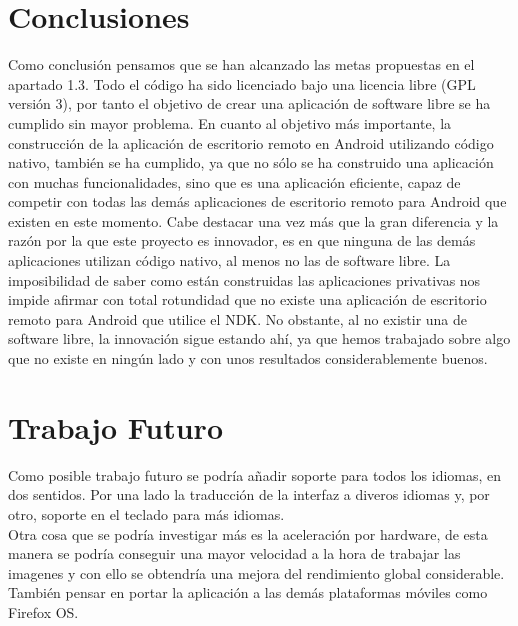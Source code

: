 \section{Conclusiones}
Como conclusión pensamos que se han alcanzado las metas propuestas en el apartado 1.3. Todo el código ha sido licenciado bajo una licencia libre (GPL versión 3), por tanto el objetivo de crear una aplicación de software libre se ha cumplido sin mayor problema. En cuanto al objetivo más importante, la construcción de la aplicación de escritorio remoto en Android utilizando código nativo, también se ha cumplido, ya que no sólo se ha construido una aplicación con muchas funcionalidades, sino que es una aplicación eficiente, capaz de competir con todas las demás aplicaciones de escritorio remoto para Android que existen en este momento. Cabe destacar una vez más que la gran diferencia y la razón por la que este proyecto es innovador, es en que ninguna de las demás aplicaciones utilizan código nativo, al menos no las de software libre. La imposibilidad de saber como están construidas las aplicaciones privativas nos impide afirmar con total rotundidad que no existe una aplicación de escritorio remoto para Android que utilice el NDK. No obstante, al no existir una de software libre, la innovación sigue estando ahí, ya que hemos trabajado sobre algo que no existe en ningún lado y con unos resultados considerablemente buenos.

\section{Trabajo Futuro}

Como posible trabajo futuro se podría añadir soporte para todos los idiomas, en dos sentidos. Por una lado la traducción de la interfaz a diveros idiomas y, por otro, soporte en el teclado para más idiomas.\\

Otra cosa que se podría investigar más es la aceleración por hardware, de esta manera se podría conseguir una mayor velocidad a la hora de trabajar las imagenes y con ello se obtendría una mejora del rendimiento global considerable.\\

También pensar en portar la aplicación a las demás plataformas móviles como Firefox OS. 
